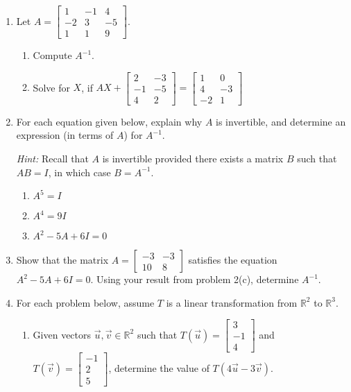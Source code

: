 \documentclass[12pt]{article}
\newcommand{\R}{\mathbb{R}}
\newcommand{\bbm}{\begin{bmatrix}}
\newcommand{\ebm}{\end{bmatrix}}
\begin{document}
 \begin{enumerate}
\item Let $A=\bbm 1&-1&4\\-2&3&-5\\1&1&9\ebm$.
\begin{enumerate}
\item Compute $A^{-1}$.

\vspace{4in}

\item Solve for $X$, if $AX+\bbm 2&-3\\-1&-5\\4&2\ebm = \bbm 1&0\\4&-3\\-2&1\ebm$
\end{enumerate}
\newpage

\item For each equation given below, explain why $A$ is invertible, and determine an expression (in terms of $A$) for $A^{-1}$.

\textit{Hint:} Recall that $A$ is invertible provided there exists a matrix $B$ such that $AB=I$, in which case $B=A^{-1}$.

\begin{enumerate}
\item $A^5=I$

\vspace{1.25in}

\item $A^4=9I$

\vspace{1.25in}

\item $A^2-5A+6I=0$

\end{enumerate}
\vspace{1.5in}

\item Show that the matrix $A=\bbm -3&-3\\10&8\ebm$ satisfies the equation $A^2-5A+6I=0$. Using your result from problem 2(c), determine $A^{-1}$.

\newpage

\item For each problem below, assume $T$ is a linear transformation from $\R^2$ to $\R^3$.
\begin{enumerate}
\item Given vectors $\vec{u},\vec{v}\in\R^2$ such that $T(\vec{u})=\bbm 3\\-1\\4\ebm$ and $T(\vec{v})=\bbm -1\\2\\5\ebm$, determine the value of $T(4\vec{u}-3\vec{v})$.


\end{enumerate}
\end{enumerate}
\end{document}
